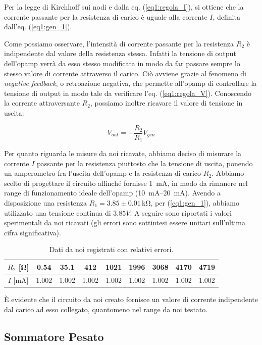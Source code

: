 Per la legge di Kirchhoff sui nodi e dalla eq. (\ref{eq1:regola_I}), si ottiene che la corrente passante per la resistenza di carico è uguale alla corrente $I$, definita dall'eq. (\ref{eq1:gen_1}).

Come possiamo osservare, l'intensità di corrente passante per la resistenza $R_2$ è indipendente dal valore della resistenza stessa. Infatti la tensione di output dell'opamp verrà da esso stesso modificata in modo da far passare sempre lo stesso valore di corrente attraverso il carico.
Ciò avviene grazie al fenomeno di \textit{negative feedback}, o retroazione negativa, che permette all'opamp di controllare la tensione di output in modo tale da verificare l'eq. (\ref{eq1:regola_V}).
Conoscendo la corrente attraversante $R_2$, possiamo inoltre ricavare il valore di tensione in uscita:

$$V_{out}=-\frac{R_2}{R_1} V_{gen}$$

Per quanto riguarda le misure da noi ricavate, abbiamo deciso di misurare la corrente $I$ passante per la resistenza piuttosto che la tensione di uscita, ponendo un amperometro fra l'uscita dell'opamp e la resistenza di carico $R_2$.
Abbiamo scelto di progettare il circuito affinché fornisse \SI{1}{\milli\ampere}, in modo da rimanere nel range di funzionamento ideale dell'opamp (\SIrange{10}{20}{\milli\ampere}).
Avendo a disposizione una resistenza $R_1=3.85 \pm 0.01\,\si{\kilo\ohm}$, per (\ref{eq1:gen_1}), abbiamo utilizzato una tensione continua di $3.85 V$. A seguire sono riportati i valori sperimentali da noi ricavati (gli errori sono sottintesi essere unitari sull'ultima cifra significativa).

\begin{table}[H]
\center
\caption{Dati da noi registrati con relativi errori.}
{\renewcommand{\arraystretch}{1.4}%
\begin{tabular}{c|c|c|c|c|c|c|c|c}
$R_2$ [\si{\ohm}] & 0.54 & 35.1 & 412 & 1021 & 1996 & 3068 & 4170 & 4719 \\ 
\hline 
$I$ [\si{\milli\ampere}] & 1.002 & 1.002 & 1.002 & 1.002 & 1.002 & 1.002 & 1.002 & 1.002 \\ 
\end{tabular}}
\end{table}


È evidente che il circuito da noi creato fornisce un valore di corrente indipendente dal carico ad esso collegato, quantomeno nel range da noi testato.

\subsection{Sommatore Pesato}

